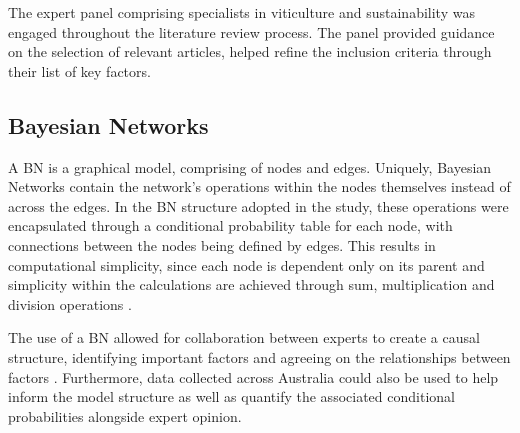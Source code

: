 The expert panel comprising specialists in viticulture and sustainability was engaged throughout the literature review process. The panel provided guidance on the selection of relevant articles, helped refine the inclusion criteria through their list of key factors.

\subsection{Bayesian Networks}

A BN is a graphical model, comprising of nodes and edges. Uniquely, Bayesian Networks contain the network's operations within the nodes themselves instead of across the edges. In the BN structure adopted in the study, these operations were encapsulated through a conditional probability table for each node, with connections between the nodes being defined by edges. This results in computational simplicity, since each node is dependent only on its parent and simplicity within the calculations are achieved through sum, multiplication and division operations
\citep{korbBayesianArtificialIntelligence2011}.

The use of a BN allowed for collaboration between experts to create a causal structure, identifying important factors and agreeing on the relationships between factors
\citep{pourretBayesianNetworksPractical2008}. Furthermore, data collected across Australia could also be used to help inform the model structure as well as quantify the associated conditional probabilities alongside expert opinion.

